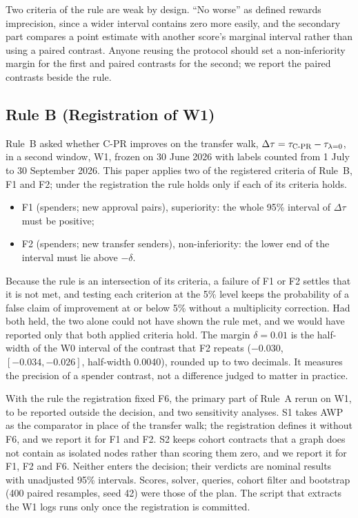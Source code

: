 \documentclass{ieeeaccess}
\newcommand{\cpr}{\mbox{C-PR}}
\begin{document}
Two criteria of the rule are weak by design. ``No worse'' as defined rewards imprecision, since a wider interval contains zero more easily, and the secondary part compares a point estimate with another score's marginal interval rather than using a paired contrast. Anyone reusing the protocol should set a non-inferiority margin for the first and paired contrasts for the second; we report the paired contrasts beside the rule.

\subsection{Rule B (Registration of W1)}
Rule~B asked whether \cpr{} improves on the transfer walk, $\Delta\tau=\tau_{\text{\cpr{}}}-\tau_{\lambda=0}$, in a second window, W1, frozen on 30 June 2026 with labels counted from 1 July to 30 September 2026. This paper applies two of the registered criteria of Rule~B, F1 and F2; under the registration the rule holds only if each of its criteria holds.
\begin{itemize}
\item F1 (spenders; new approval pairs), superiority: the whole 95\% interval of $\Delta\tau$ must be positive;
\item F2 (spenders; new transfer senders), non-inferiority: the lower end of the interval must lie above $-\delta$.
\end{itemize}
Because the rule is an intersection of its criteria, a failure of F1 or F2 settles that it is not met, and testing each criterion at the 5\% level keeps the probability of a false claim of improvement at or below 5\% without a multiplicity correction. Had both held, the two alone could not have shown the rule met, and we would have reported only that both applied criteria hold. The margin $\delta=0.01$ is the half-width of the W0 interval of the contrast that F2 repeats ($-0.030$, $[-0.034,-0.026]$, half-width 0.0040), rounded up to two decimals. It measures the precision of a spender contrast, not a difference judged to matter in practice.

With the rule the registration fixed F6, the primary part of Rule~A rerun on W1, to be reported outside the decision, and two sensitivity analyses. S1 takes AWP as the comparator in place of the transfer walk; the registration defines it without F6, and we report it for F1 and F2. S2 keeps cohort contracts that a graph does not contain as isolated nodes rather than scoring them zero, and we report it for F1, F2 and F6. Neither enters the decision; their verdicts are nominal results with unadjusted 95\% intervals. Scores, solver, queries, cohort filter and bootstrap (400 paired resamples, seed 42) were those of the plan. The script that extracts the W1 logs runs only once the registration is committed.
\end{document}
